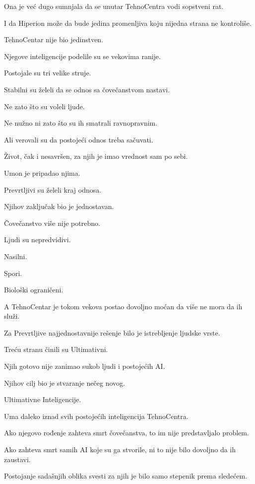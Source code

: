 Ona je već dugo sumnjala da se unutar TehnoCentra vodi sopstveni rat.

I da Hiperion može da bude jedina promenljiva koju nijedna strana ne kontroliše.

\bigskip

TehnoCentar nije bio jedinstven.

Njegove inteligencije podelile su se vekovima ranije.

Postojale su tri velike struje.

Stabilni su želeli da se odnos sa čovečanstvom nastavi.

Ne zato što su voleli ljude.

Ne nužno ni zato što su ih smatrali ravnopravnim.

Ali verovali su da postojeći odnos treba sačuvati.

Život, čak i nesavršen, za njih je imao vrednost sam po sebi.

Umon je pripadao njima.

\bigskip

Prevrtljivi su želeli kraj odnosa.

Njihov zaključak bio je jednostavan.

Čovečanstvo više nije potrebno.

Ljudi su nepredvidivi.

Nasilni.

Spori.

Biološki ograničeni.

A TehnoCentar je tokom vekova postao dovoljno moćan da više ne mora da ih služi.

Za Prevrtljive najjednostavnije rešenje bilo je istrebljenje ljudske vrste.

\bigskip

Treću stranu činili su Ultimativni.

Njih gotovo nije zanimao sukob ljudi i postojećih AI.

Njihov cilj bio je stvaranje nečeg novog.

Ultimativne Inteligencije.

Uma daleko iznad svih postojećih inteligencija TehnoCentra.

Ako njegovo rođenje zahteva smrt čovečanstva, to im nije predstavljalo problem.

Ako zahteva smrt samih AI koje su ga stvorile, ni to nije bilo dovoljno da ih zaustavi.

Postojanje sadašnjih oblika svesti za njih je bilo samo stepenik prema sledećem.

